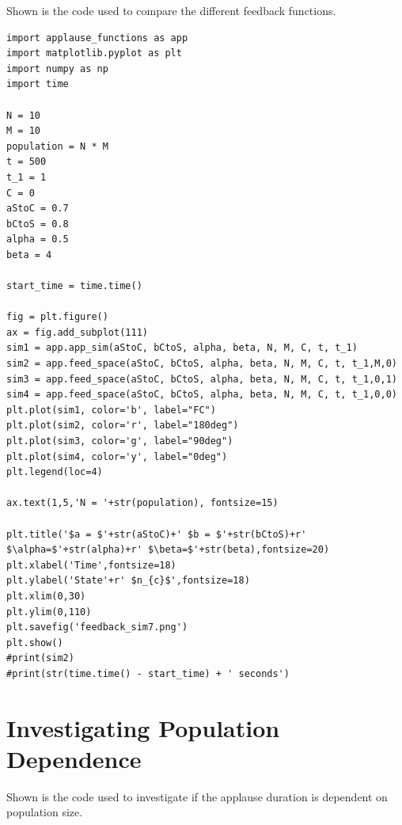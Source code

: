 Shown is the code used to compare the different feedback functions.

\begin{lstlisting}
import applause_functions as app
import matplotlib.pyplot as plt
import numpy as np
import time

N = 10
M = 10
population = N * M
t = 500
t_1 = 1
C = 0
aStoC = 0.7
bCtoS = 0.8
alpha = 0.5
beta = 4

start_time = time.time()

fig = plt.figure()
ax = fig.add_subplot(111)
sim1 = app.app_sim(aStoC, bCtoS, alpha, beta, N, M, C, t, t_1)
sim2 = app.feed_space(aStoC, bCtoS, alpha, beta, N, M, C, t, t_1,M,0)
sim3 = app.feed_space(aStoC, bCtoS, alpha, beta, N, M, C, t, t_1,0,1)
sim4 = app.feed_space(aStoC, bCtoS, alpha, beta, N, M, C, t, t_1,0,0)
plt.plot(sim1, color='b', label="FC")
plt.plot(sim2, color='r', label="180deg")
plt.plot(sim3, color='g', label="90deg")
plt.plot(sim4, color='y', label="0deg")
plt.legend(loc=4)

ax.text(1,5,'N = '+str(population), fontsize=15)

plt.title('$a = $'+str(aStoC)+' $b = $'+str(bCtoS)+r' $\alpha=$'+str(alpha)+r' $\beta=$'+str(beta),fontsize=20)
plt.xlabel('Time',fontsize=18)
plt.ylabel('State'+r' $n_{c}$',fontsize=18)
plt.xlim(0,30)
plt.ylim(0,110)
plt.savefig('feedback_sim7.png')
plt.show()
#print(sim2)
#print(str(time.time() - start_time) + ' seconds')
\end{lstlisting} 

\newpage
\section{Investigating Population Dependence}
\label{apndx:popdep}
Shown is the code used to investigate if the applause duration is dependent on population size.

